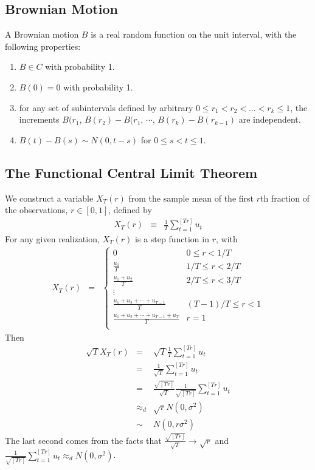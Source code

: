 \documentclass{article}
\begin{document}
\subsection{Brownian Motion}
A Brownian motion $B$ is a real random function on the unit interval, with the following properties:
\begin{enumerate}
\item $B\in C$ with probability 1.
\item $B(0)=0$ with probability 1.
\item for any set of subintervals defined by arbitrary $0\leq r_{1}<r_{2}<\dots<r_{k}\leq 1$, the increments $B(r_{1}$, $B(r_{2})-B(r_{1}$, $\cdots$, $B(r_{k})-B(r_{k-1})$ are independent.
\item $B(t)-B(s)\sim N(0,t-s)$ for $0\leq s<t\leq 1$.
\end{enumerate}

\subsection{The Functional Central Limit Theorem}
We construct a variable $X_{T}(r)$ from the sample mean of the first $r$th fraction of the observations, $r\in[0,1]$, defined by
\begin{eqnarray*}
X_{T}(r)&\equiv&\frac{1}{T}\sum_{t=1}^{[Tr]}u_{t}
\end{eqnarray*}
For any given realization, $X_{T}(r)$ is a step function in $r$, with
\begin{eqnarray*}
X_{T}(r)&=&\begin{cases}
0						&	0\leq r<1/T\\
\frac{u_{1}}{T}				&	1/T\leq r<2/T\\
\frac{u_{1}+u_{2}}{T}		&	2/T\leq r<3/T\\
\vdots					&				\\
\frac{u_{1}+u_{2}+\cdots+u_{T-1}}{T}		&	(T-1)/T\leq r<1\\
\frac{u_{1}+u_{2}+\cdots+u_{T-1}+u_{T}}{T}		&	r=1\\
\end{cases}
\end{eqnarray*}
Then 
\begin{eqnarray*}
\sqrt{T}X_{T}(r)&=&\sqrt{T}\frac{1}{T}\sum_{t=1}^{[Tr]}u_{t}\\
			&=&\frac{1}{\sqrt{T}}\sum_{t=1}^{[Tr]}u_{t}\\
			&=&\frac{\sqrt{[Tr]}}{\sqrt{T}}\frac{1}{\sqrt{[Tr]}}\sum_{t=1}^{[Tr]}u_{t}\\
			&\approx_{d}&\sqrt{r} N(0,\sigma^{2})\\
			&\sim&N(0,r\sigma^{2})
\end{eqnarray*}
The last second comes from the facts that $\frac{\sqrt{[Tr]}}{\sqrt{T}}\to \sqrt{r}$ and $\frac{1}{\sqrt{[Tr]}}\sum_{t=1}^{[Tr]}u_{t}\approx_{d}N(0,\sigma^{2})$.
\end{document}
